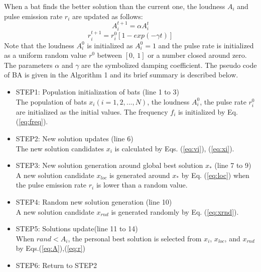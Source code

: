 \documentclass[conference]{IEEEtran}
\begin{document}
When a bat finds the better solution than the current one, the loudness $A_i$ and pulse emission rate $r_i$ are updated as follows:
\begin{equation}
A_i^{t+1}=\alpha A_i^t
\label{eq:A}
\end{equation}
\begin{equation}
r_i^{t+1}=r_i^0[1-exp(-\gamma t)]
\label{eq:r}
\end{equation}
Note that the loudness $A_i^0$ is initialized as $A_i^0=1$ and the pulse rate is initialized as a uniform random value $r^0$ between $[0, \ 1]$ or a number closed around zero. The parameters $\alpha$ and $\gamma$ are the symbolized damping coefficient. The pseudo code of BA is given in the Algorithm 1 and its brief summary is described below.

\begin{itemize}
\item STEP1: Population initialization of bats (line 1 to 3)\\
The population of bats ${x_i}(i=1, 2, ..., N)$, the loudness ${A_i^0}$, the pulse rate ${r_i^0}$ are initialized as the initial values. The frequency ${f_i}$ is initialized by Eq.(\ref{eq:freq}).
\item STEP2: New solution updates (line 6)\\
The new solution candidates ${x_i}$ is calculated by Eqs. (\ref{eq:vi}), (\ref{eq:xi}).
\item STEP3: New solution generation around global best solution ${x_*}$ (line 7 to 9)\\
A new solution candidate $x_{loc}$ is generated around $x_*$ by Eq. (\ref{eq:loc}) when the pulse emission rate $r_i$ is lower than a random value.
\item STEP4: Random new solution generation (line 10)\\
A new solution candidate ${x_{rnd}}$ is generated randomly by Eq. (\ref{eq:xrnd}).  
\item STEP5: Solutions update(line 11 to 14)\\
When ${rand < A_i}$, the personal best solution is selected from $x_i$, ${x_{loc}}$, and ${x_{rnd}}$ by Eqs.(\ref{eq:A}),(\ref{eq:r})
\item STEP6: Return to STEP2 
\end{itemize}
\end{document}
